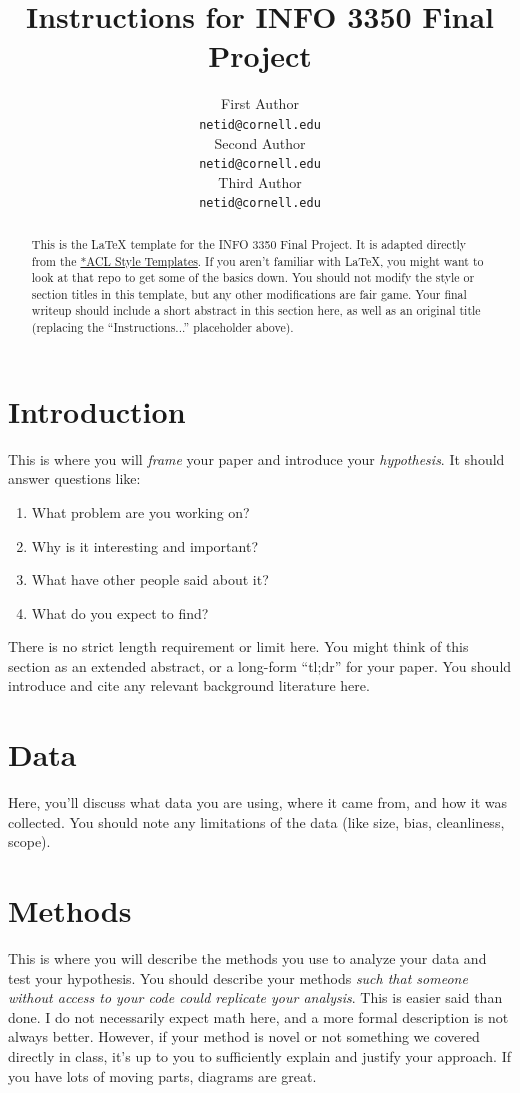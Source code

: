 \documentclass[11pt]{article}
\title{Instructions for INFO 3350 Final Project}
\author{First Author \\
  \texttt{netid@cornell.edu} \\\And
  Second Author \\
  \texttt{netid@cornell.edu} \\ \And
  Third Author \\
  \texttt{netid@cornell.edu} \\ }
\begin{document}
\maketitle
\begin{abstract}
This is the \LaTeX{} template for the INFO 3350 Final Project. It is adapted directly from the \href{https://github.com/acl-org/acl-style-files/}{*ACL Style Templates}. If you aren't familiar with \LaTeX{}, you might want to look at that repo to get some of the basics down. You should not modify the style or section titles in this template, but any other modifications are fair game. Your final writeup should include a short abstract in this section here, as well as an original title (replacing the ``Instructions...'' placeholder above). 
\end{abstract}

\section{Introduction}
This is where you will \textit{frame} your paper and introduce your \textit{hypothesis}. It should answer questions like: 
\begin{enumerate}
    \item What problem are you working on? 
    \item Why is it interesting and important? 
    \item What have other people said about it? 
    \item What do you expect to find?
\end{enumerate}
There is no strict length requirement or limit here. You might think of this section as an extended abstract, or a long-form ``tl;dr'' for your paper. You should introduce and cite any relevant background literature here. 

\section{Data}
Here, you'll discuss what data you are using, where it came from, and how it was collected. You should note any limitations of the data (like size, bias, cleanliness, scope). 

\section{Methods}
This is where you will describe the methods you use to analyze your data and test your hypothesis. You should describe your methods \textit{such that someone without access to your code could replicate your analysis}. This is easier said than done. I do not necessarily expect math here, and a more formal description is not always better. However, if your method is novel or not something we covered directly in class, it's up to you to sufficiently explain and justify your approach. If you have lots of moving parts, diagrams are great.  
\end{document}
